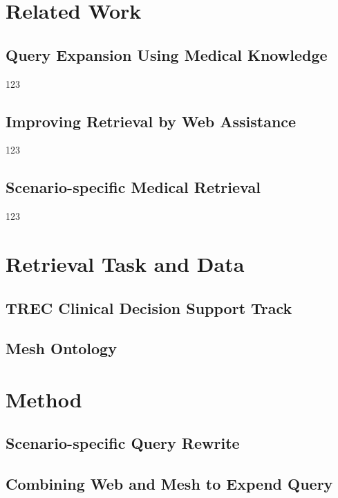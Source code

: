 \documentclass{IEEEtran}
\begin{document}
\section{Related Work}
\subsection{Query Expansion Using Medical Knowledge}
123\cite{aronson1997query,lu2009evaluation,zhu2012improving,drame2014query,diaz2009query,jain2012enhancing,abachalist,zhangcbia,Cengage,goodwin2011cohort,zhu2011using,schuemie2011dutchhattrick,wu2011exploration,daoud2011york}

\subsection{Improving Retrieval by Web Assistance}
123\cite{kwok2005improving,el2013qcri,balaneshin2015wsu,song2015ecnu}

\subsection{Scenario-specific Medical Retrieval}
123\cite{liu2007knowledge}

\section{Retrieval Task and Data}
\subsection{TREC Clinical Decision Support Track}

\subsection{Mesh Ontology}

\section{Method}
\subsection{Scenario-specific Query Rewrite}

\subsection{Combining Web and Mesh to Expend Query}
\end{document}
